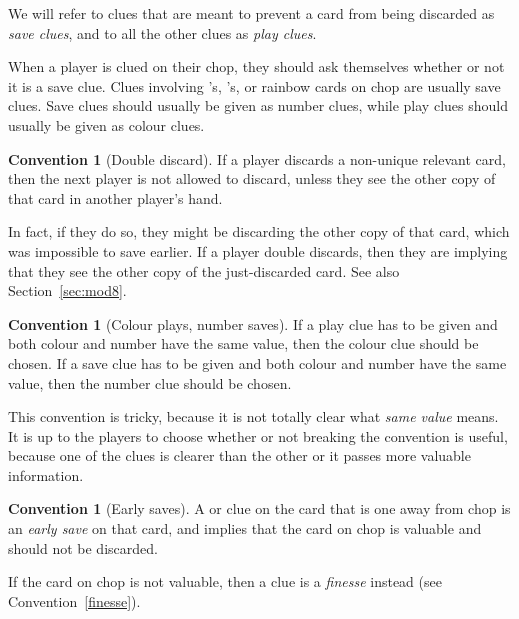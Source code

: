 \documentclass[a4paper]{article}
\theoremstyle{plain}
\theoremstyle{definition}
\newtheorem{convention}[theorem]{Convention}
\begin{document}
We will refer to clues that are meant to prevent a card from being discarded as \textit{save clues}, and to all the other clues as \textit{play clues}.

When a player is clued on their chop, they should ask themselves whether or not it is a save clue. Clues involving 's, 's, or rainbow cards on chop are usually save clues. Save clues should usually be given as number clues, while play clues should usually be given as colour clues. %

\begin{convention}[Double discard]
	\label{double-discard}
	If a player discards a non-unique relevant card, then the next player is not allowed to discard, unless they see the other copy of that card in another player's hand.
\end{convention}

In fact, if they do so, they might be discarding the other copy of that card, which was impossible to save earlier. If a player double discards, then they are implying that they see the other copy of the just-discarded card. See also Section~\ref{sec:mod8}.

\begin{convention}[Colour plays, number saves]
	If a play clue has to be given and both colour and number have the same value, then the colour clue should be chosen. If a save clue has to be given and both colour and number have the same value, then the number clue should be chosen.
\end{convention}

This convention is tricky, because it is not totally clear what \textit{same value} means. It is up to the players to choose whether or not breaking the convention is useful, because one of the clues is clearer than the other or it passes more valuable information.

\begin{convention}[Early saves]
	A  or  clue on the card that is one away from chop is an \textit{early save} on that card, and implies that the card on chop is valuable and should not be discarded.
	
	If the card on chop is not valuable, then a  clue is a \textit{finesse} instead (see Convention~\ref{finesse}).
\end{convention}
\end{document}
